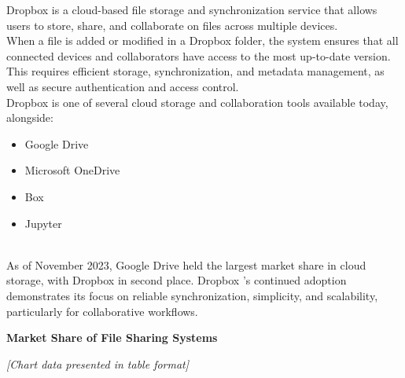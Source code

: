 

Dropbox is a cloud-based file storage and synchronization service that allows users to store, share, and collaborate on files across multiple devices.
\\
When a file is added or modified in a Dropbox folder, the system ensures that all connected devices and collaborators have access to the most up-to-date version. This requires efficient storage, synchronization, and metadata management, as well as secure authentication and access control.
\\
Dropbox is one of several cloud storage and collaboration tools available today, alongside:

\begin{itemize}
\item
\protect{}\label{sY7LNhE-RgIpUUGpjkEq8}
Google Drive
\item
\protect{}\label{rVCnJCWxNSkdE01VpK6DI}
Microsoft OneDrive
\item
\protect{}\label{gNeRvOhErN8idpQ2taBTE}
Box
\item
\protect{}\label{FdYkCVsAfZUDN3SnO-AV5}
Jupyter
\end{itemize}
\\
As of November 2023, Google Drive held the largest market share in cloud storage, with Dropbox in second place. Dropbox 's continued adoption demonstrates its focus on reliable synchronization, simplicity, and scalability, particularly for collaborative workflows.

\textbf{Market Share of File Sharing Systems}

\textit{\small [Chart data presented in table format]}

\begin{table}[htbp]
\centering
\small
{}
\caption{The market share of top 5 file synchronization and sharing services}
\end{table}

